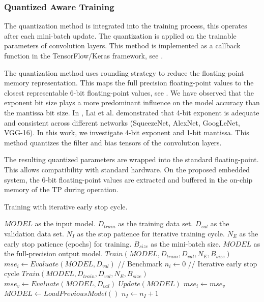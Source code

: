 \subsubsection{Quantized Aware Training}
The quantization method is integrated into the training process, this operates after each mini-batch update. The quantization is applied on the trainable parameters of convolution layers. This method is implemented as a callback function in the TensorFlow/Keras framework, see .

The quantization method uses rounding strategy to reduce the floating-point memory representation. This maps the full precision floating-point values to the closest representable 6-bit floating-point values, see . We have observed that the exponent bit size plays a more predominant influence on the model accuracy than the mantissa bit size. In \cite{lai2017deep}, Lai et al. demonstrated that 4-bit exponent is adequate and consistent across different networks (SqueezeNet, AlexNet, GoogLeNet, VGG-16). In this work, we investigate 4-bit exponent and 1-bit mantissa. This method quantizes the filter and bias tensors of the convolution layers.

The resulting quantized parameters are wrapped into the standard floating-point. This allows compatibility with standard hardware. On the proposed embedded system, the 6-bit floating-point values are extracted and buffered in the on-chip memory of the TP during operation.

\begin{algorithm}[h!]
	\label{alg:training}
	\caption{Training with iterative early stop cycle.}
	\begin{algorithmic}
		\SetAlgoLined
		\renewcommand{\algorithmicrequire}{\textbf{input:}}
		\renewcommand{\algorithmicensure}{\textbf{output:}}
		\REQUIRE $MODEL$ as the input model.
		\REQUIRE $D_{train}$ as the training data set.
		\REQUIRE $D_{val}$ as the validation data set.
		\REQUIRE $N_{I}$ as the stop patience for iterative training cycle.
		\REQUIRE $N_{E}$ as the early stop patience (epochs) for training.
		\REQUIRE $B_{size}$ as the mini-batch size.
		\ENSURE $MODEL$ as the full-precision output model.
		\STATE $Train(MODEL, D_{train}, D_{val}, N_{E}, B_{size})$
		\STATE $mse_i \gets Evaluate(MODEL, D_{val})$ // Benchmark
		\STATE $n_i \gets 0$
		\STATE // Iterative early stop cycle
		\STATE $Train(MODEL, D_{train}, D_{val}, N_{E}, B_{size})$
		\STATE $mse_v \gets Evaluate(MODEL, D_{val})$
			\STATE $Update(MODEL)$
			\STATE $mse_i \gets mse_v$
		\ELSE
			\STATE $MODEL  \gets LoadPreviousModel()$
			\STATE $n_I \gets n_I + 1$
		\ENDIF
		\ENDWHILE
	\end{algorithmic}
\end{algorithm}



